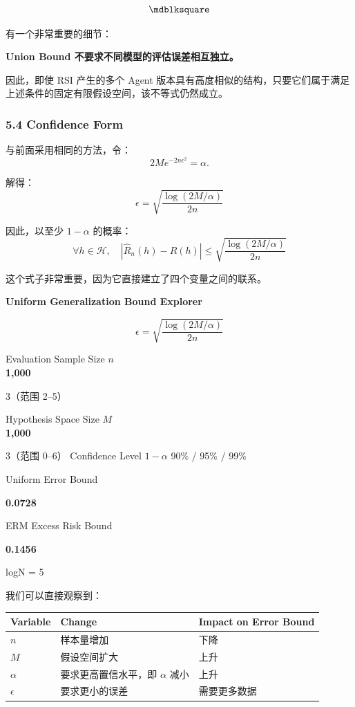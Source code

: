 \[\hfill\blacksquare\]

有一个非常重要的细节：

\textbf{Union Bound 不要求不同模型的评估误差相互独立。}

因此，即使 RSI 产生的多个 Agent 版本具有高度相似的结构，只要它们属于满足上述条件的固定有限假设空间，该不等式仍然成立。

\hypertarget{part-2-14-0001-confidence-form-1}{%
\subsubsection{5.4 Confidence Form}\label{part-2-14-0001-confidence-form-1}}

与前面采用相同的方法，令：
\[2Me^{-2n\epsilon^2}=\alpha.\]

解得：
\[\boxed{
\epsilon
=
\sqrt{
\frac{\log(2M/\alpha)}{2n}
}
}\]

因此，以至少 \(1-\alpha\) 的概率：
\[\boxed{
\forall h\in\mathcal H,\quad
|\widehat R_n(h)-R(h)|
\leq
\sqrt{
\frac{\log(2M/\alpha)}{2n}
}
}\]

这个式子非常重要，因为它直接建立了四个变量之间的联系。

\textbf{Uniform Generalization Bound Explorer}

\[\epsilon=\sqrt{\frac{\log(2M/\alpha)}{2n}}\]

Evaluation Sample Size \(n\)\\
\textbf{1,000}

3（范围 2--5）

Hypothesis Space Size \(M\)\\
\textbf{1,000}

3（范围 0--6） Confidence Level \(1-\alpha\) 90\% / 95\% / 99\%

Uniform Error Bound

\textbf{0.0728}

ERM Excess Risk Bound

\textbf{0.1456}


logN = 5


我们可以直接观察到：

\begin{readertable}
\begin{longtable}[]{@{}
  >{\raggedright\arraybackslash}p{}
  >{\raggedright\arraybackslash}p{}
  >{\raggedright\arraybackslash}p{}@{}}
\toprule
Variable & Change & Impact on Error Bound \\
\midrule
\endhead
\(n\) & 样本量增加 & 下降 \\
\(M\) & 假设空间扩大 & 上升 \\
\(\alpha\) & 要求更高置信水平，即 \(\alpha\) 减小 & 上升 \\
\(\epsilon\) & 要求更小的误差 & 需要更多数据 \\
\bottomrule
\end{longtable}
\end{readertable}

